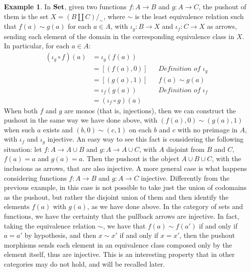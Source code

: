 \documentclass[a4paper, twoside,openright]{report}
\theoremstyle{plain}
\theoremstyle{definition}
\newtheorem{example}[theorem]{Example}
\begin{document}
\begin{example}\label{ex:po_in_set}
    \color{blue}
    In $\mathbf{Set}$, given two functions $f: A \rightarrow B$ and $g: A \rightarrow C$, the pushout of them is the set $X = (B \amalg C) /_\sim$, where $\sim$ is the least equivalence relation such that $f(a) \sim g(a)$ for each $a \in A$, with $\iota_g:B \rightarrow X$ and $\iota_f : C \rightarrow X$ as arrows, sending each element of the domain in the corresponding equivalence class in $X$. In particular, for each $a \in A$:
    \begin{align*}
        (\iota_g \circ f) (a)
                        &= \iota_g(f(a))    &&\\
                        &= [(f(a), 0)]           && \textit{Definition of $\iota_g$} \\
                        &= [(g(a), 1)]           && f(a) \sim g(a) \\
                        &= \iota_f(g(a))    && \textit{Definition of $\iota_f$} \\
                        &= (\iota_f \circ g) (a) &&
    \end{align*}
    When both $f$ and $g$ are monos (that is, injections), then we can construct the pushout in the same way we have done above, with $(f(a), 0) \sim (g(a), 1)$ when such $a$ exists and $(b, 0) \sim (c, 1)$ on each $b$ and $c$ with no preimage in $A$, with $\iota_f$ and $\iota_g$ injective.
    An easy way to see this fact is considering the following situation: let $f: A \rightarrow A \cup B$ and $g: A \rightarrow A \cup C$, with $A$ disjoint from $B$ and $C$, $f(a)= a$ and $g(a) = a$. Then the pushout is the object $A \cup B \cup C$, with the inclusions as arrows, that are also injective.
    A more general case is what happens considering functions $f: A \rightarrow B$ and $g: A \rightarrow C$ injective. Differently from the previous example, in this case is not possible to take just the union of codomains as the pushout, but rather the disjoint union of them and then identify the elements $f(a)$ with $g(a)$, as we have done above. In the category of sets and functions, we have the certainty that the pullback arrows are injective. In fact, taking the equivalence relation $\sim$, we have that $f(a) \sim f(a')$ if and only if $a = a'$ by hypothesis, and then $x \sim x'$ if and only if $x = x'$, then the pushout morphisms sends each element in an equivalence class composed only by the element itself, thus are injective.
    This is an interesting property that in other categories may do not hold, and will be recalled later.
\end{example}
\end{document}
